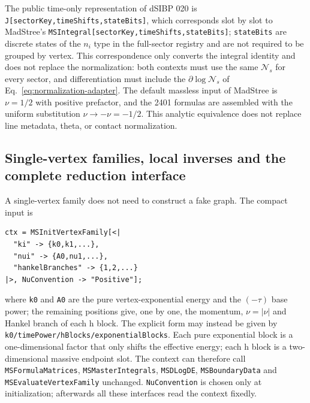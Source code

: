 \documentclass[11pt,a4paper]{article}
\newcommand{\cN}{\mathcal N}
\begin{document}
The public time-only representation of dSIBP 020 is \texttt{J[sectorKey,timeShifts,stateBits]}, which corresponds slot by slot to MadStree's \texttt{MSIntegral[sectorKey,timeShifts,stateBits]}; \texttt{stateBits} are discrete states of the $n_i$ type in the full-sector registry and are not required to be grouped by vertex. This correspondence only converts the integral identity and does not replace the normalization: both contexts must use the same $\cN_s$ for every sector, and differentiation must include the $\partial\log\cN_s$ of Eq.~\eqref{eq:normalization-adapter}. The default massless input of MadStree is $\nu=1/2$ with positive prefactor, and the 2401 formulas are assembled with the uniform substitution $\nu\to-\nu=-1/2$. This analytic equivalence does not replace line metadata, theta, or contact normalization.

\subsection{Single-vertex families, local inverses and the complete reduction interface}

A single-vertex family does not need to construct a fake graph. The compact input is
\begin{verbatim}
ctx = MSInitVertexFamily[<|
  "ki" -> {k0,k1,...},
  "nui" -> {A0,nu1,...},
  "hankelBranches" -> {1,2,...}
|>, NuConvention -> "Positive"];
\end{verbatim}
where \texttt{k0} and \texttt{A0} are the pure vertex-exponential energy and the $(-\tau)$ base power; the remaining positions give, one by one, the momentum, $\nu=|\nu|$ and Hankel branch of each h block. The explicit form may instead be given by \texttt{k0/timePower/hBlocks/exponentialBlocks}. Each pure exponential block is a one-dimensional factor that only shifts the effective energy; each h block is a two-dimensional massive endpoint slot. The context can therefore call \texttt{MSFormulaMatrices}, \texttt{MSMasterIntegrals}, \texttt{MSDLogDE}, \texttt{MSBoundaryData} and \texttt{MSEvaluateVertexFamily} unchanged. \texttt{NuConvention} is chosen only at initialization; afterwards all these interfaces read the context fixedly.
\end{document}
